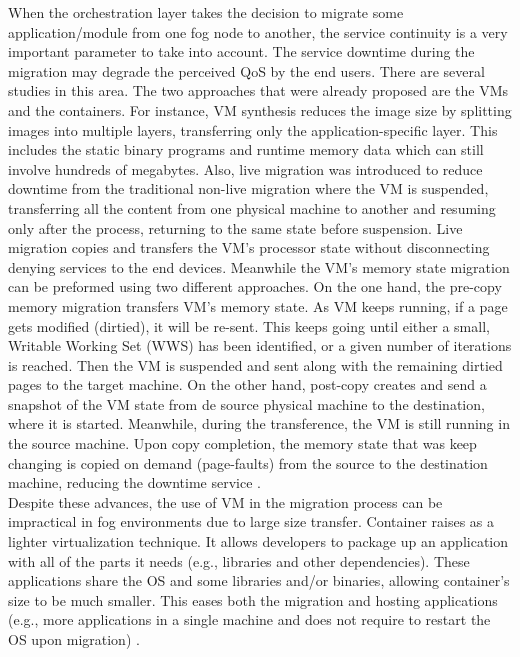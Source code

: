 \noindent\tab When the orchestration layer takes the decision to migrate some application/module from one fog node to another, the service continuity is a very important parameter to take into account. The service downtime during the migration may degrade the perceived QoS by the end users. There are several studies in this area. The two approaches that were already proposed are the VMs and the containers. For instance, VM synthesis reduces the image size by splitting images into multiple layers, transferring only the application-specific layer. This includes the static binary programs and runtime memory data \cite{ma2017efficient} which can still involve hundreds of megabytes. Also, live migration was introduced to reduce downtime from the traditional non-live migration where the VM is suspended, transferring all the content from one physical machine to another and resuming only after the process, returning to the same state before suspension. Live migration copies and transfers the VM's processor state without disconnecting denying services to the end devices. Meanwhile the VM's memory state migration can be preformed using two different approaches. On the one hand, the pre-copy memory migration transfers VM’s memory state. As VM keeps running, if a page gets modified (dirtied), it will be re-sent. This keeps going until either a small, Writable Working Set (WWS) has been identified, or a given number of iterations is reached. Then the VM is suspended and sent along with the remaining dirtied pages to the target machine. On the other hand, post-copy creates and send a snapshot of the VM state from de source physical machine to the destination, where it is started. Meanwhile, during the transference, the VM is still running in the source machine. Upon copy completion, the memory state that was keep changing is copied on demand (page-faults) from the source to the destination machine, reducing the downtime service \cite{hines2009post}.\\
\noindent\tab Despite these advances, the use of VM in the migration process can be impractical in fog environments due to large size transfer. Container raises as a lighter virtualization technique. It allows developers to package up an application with all of the parts it needs (e.g., libraries and other dependencies). These applications share the OS and some libraries and/or binaries, allowing container's size to be much smaller. This eases both the migration and hosting applications (e.g., more applications in a single machine and does not require to restart the OS upon migration) \cite{saurez2016incremental}.\\
